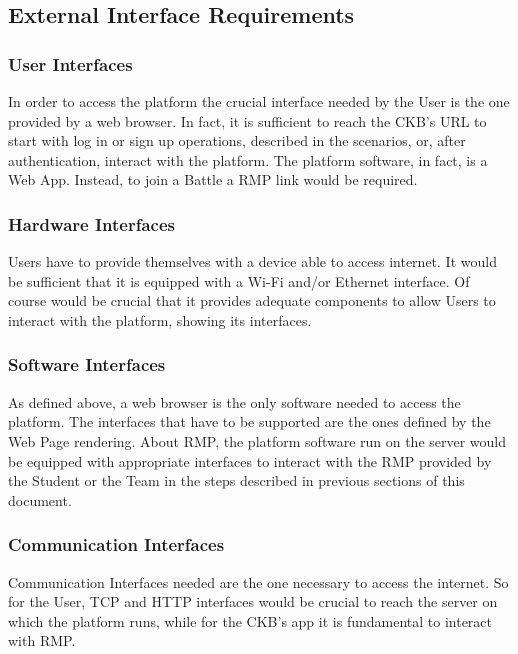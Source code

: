 \subsection{External Interface Requirements}

\subsubsection{User Interfaces}
In order to access the platform the crucial interface needed by the User is the one provided by a web browser. In fact, it is sufficient to reach the CKB's URL to start with log in or sign up operations, described in the scenarios, or, 
after authentication, interact with the platform. The platform software, in fact, is a Web App. Instead, to join a Battle a RMP link would be required.

\subsubsection{Hardware Interfaces}
Users have to provide themselves with a device able to access internet. It would be sufficient that it is equipped with a Wi-Fi and/or Ethernet interface. Of course would be crucial that it provides adequate components to allow Users 
to interact with the platform, showing its interfaces.

\subsubsection{Software Interfaces}
As defined above, a web browser is the only software needed to access the platform. The interfaces that have to be supported are the ones defined by the Web Page rendering. About RMP, the platform software run on the server would be 
equipped with appropriate interfaces to interact with the RMP provided by the Student or the Team in the steps described in previous sections of this document.
\subsubsection{Communication Interfaces}
Communication Interfaces needed are the one necessary to access the internet. So for the User, TCP and HTTP interfaces would be crucial to reach the server on which the platform runs, while for the CKB's app it is fundamental to 
interact with RMP.

\newpage

